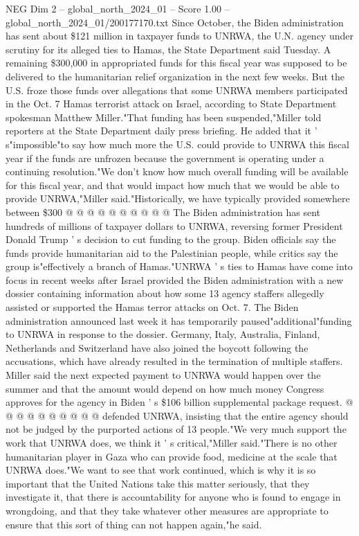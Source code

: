 \begin{textsample}{NEG Dim 2 – global\_north\_2024\_01 – Score 1.00 – global\_north\_2024\_01/200177170.txt}  \label{ex:f2_neg_335}
Since October, the Biden administration has sent about \$121 million in taxpayer funds to UNRWA, the U.N. agency under scrutiny for its alleged ties to Hamas, the State Department said Tuesday.
A remaining \$300,000 in appropriated funds for this fiscal year was supposed to be delivered to the humanitarian relief organization in the next few weeks.
But the U.S. froze those funds over allegations that some UNRWA members participated in the Oct. 7 Hamas terrorist attack on Israel, according to State Department spokesman Matthew Miller."That funding has been suspended,"Miller told reporters at the State Department daily press briefing.
He added that it ' s"impossible"to say how much more the U.S. could provide to UNRWA this fiscal year if the funds are unfrozen because the government is operating under a continuing resolution."We don't know how much overall funding will be available for this fiscal year, and that would impact how much that we would be able to provide UNRWA,"Miller said."Historically, we have typically provided somewhere between \$300 @ @ @ @ @ @ @ @ @ @ The Biden administration has sent hundreds of millions of taxpayer dollars to UNRWA, reversing former President Donald Trump ' s decision to cut funding to the group.
Biden officials say the funds provide humanitarian aid to the Palestinian people, while critics say the group is"effectively a branch of Hamas."UNRWA ' s ties to Hamas have come into focus in recent weeks after Israel provided the Biden administration with a new dossier containing information about how some 13 agency staffers allegedly assisted or supported the Hamas terror attacks on Oct. 7.
The Biden administration announced last week it has temporarily paused"additional"funding to UNRWA in response to the dossier.
Germany, Italy, Australia, Finland, Netherlands and Switzerland have also joined the boycott following the accusations, which have already resulted in the termination of multiple staffers.
Miller said the next expected payment to UNRWA would happen over the summer and that the amount would depend on how much money Congress approves for the agency in Biden ' s \$106 billion supplemental package request. @ @ @ @ @ @ @ @ @ @ defended UNRWA, insisting that the entire agency should not be judged by the purported actions of 13 people."We very much support the work that UNRWA does, we think it ' s critical,"Miller said."There is no other humanitarian player in Gaza who can provide food, medicine at the scale that UNRWA does."We want to see that work continued, which is why it is so important that the United Nations take this matter seriously, that they investigate it, that there is accountability for anyone who is found to engage in wrongdoing, and that they take whatever other measures are appropriate to ensure that this sort of thing can not happen again,"he said.

\end{textsample}
